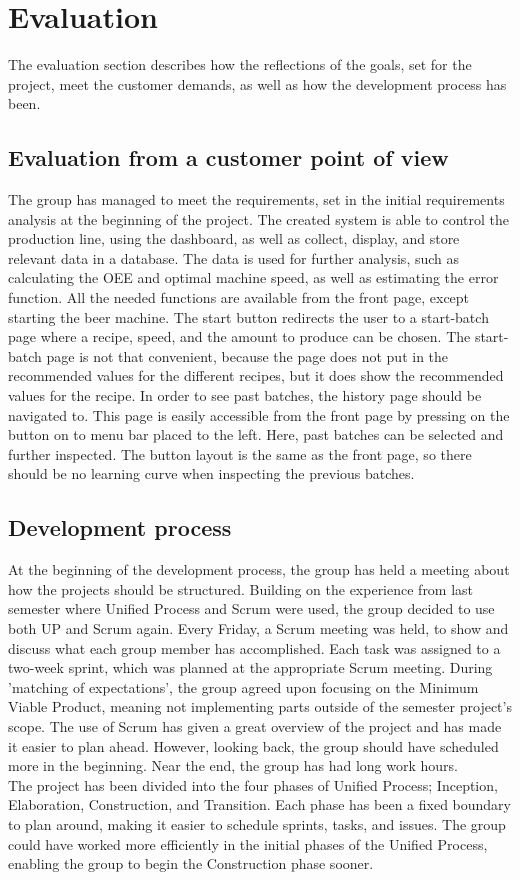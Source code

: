 \section{Evaluation}
The evaluation section describes how the reflections of the goals, set for the
project, meet the customer demands, as well as how the development process has
been.


\subsection{Evaluation from a customer point of view}
The group has managed to meet the requirements, set in the initial requirements
analysis at the beginning of the project. The created system is able to control
the production line, using the dashboard, as well as collect, display, and
store relevant data in a database. The data is used for further analysis, such
as calculating the OEE and optimal machine speed, as well as estimating the
error function. All the needed functions are available from the front page,
except starting the beer machine. The start button redirects the user to a
start-batch page where a recipe, speed, and the amount to produce can be chosen.
The start-batch page is not that convenient, because the page does not put in
the recommended values for the different recipes, but it does show the
recommended values for the recipe. In order to see past batches, the history
page should be navigated to. This page is easily accessible from the front page
by pressing on the button on to menu bar placed to the left. Here, past batches
can be selected and further inspected. The button layout is the same as the
front page, so there should be no learning curve when inspecting the previous
batches.


\subsection{Development process}
At the beginning of the development process, the group has held a meeting
about how the projects should be structured. Building on the experience from
last semester where Unified Process and Scrum were used, the group decided to
use both UP and Scrum again. Every Friday, a Scrum meeting was held, to show and
discuss what each group member has accomplished. Each task was assigned to a
two-week sprint, which was planned at the appropriate Scrum meeting. During
'matching of expectations', the group agreed upon focusing on the Minimum
Viable Product, meaning not implementing parts outside of the semester project's
scope. The use of Scrum has given a great overview of the project and has made
it easier to plan ahead. However, looking back, the group should have scheduled 
more in the beginning. Near the end, the group has had long work hours.\\

The project has been divided into the four phases of Unified Process; Inception,
Elaboration, Construction, and Transition. Each phase has been a fixed boundary
to plan around, making it easier to schedule sprints, tasks, and issues. The
group could have worked more efficiently in the initial phases of the Unified
Process, enabling the group to begin the Construction phase sooner.
